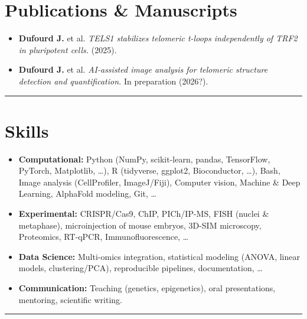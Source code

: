 \documentclass[11pt,a4paper]{article}
\let\oldlabelitemi\labelitemi
\begin{document}
\section*{Publications \& Manuscripts}
\renewcommand{\labelitemi}{\faBook}
\begin{itemize}
  \item \textbf{Dufourd J.} et al. \textit{TELS1 stabilizes telomeric \textit{t}-loops independently of TRF2 in pluripotent cells.} (2025).
  \item \textbf{Dufourd J.} et al. \textit{AI-assisted image analysis for telomeric structure detection and quantification.} In preparation (2026?).
\end{itemize}
\renewcommand{\labelitemi}{\oldlabelitemi}
\vspace{2pt}
\noindent\textcolor{sapin}{\rule{\textwidth}{0.6pt}}
\section*{Skills} %
\begin{itemize}
    \renewcommand{\labelitemi}{\raisebox{0.2ex}{\scalebox{0.7}{\faTerminal}}}
    \item \textbf{Computational:} Python (NumPy, scikit-learn, pandas, TensorFlow, PyTorch, Matplotlib, \ldots), R (tidyverse, ggplot2, Bioconductor, \ldots), Bash, Image analysis (CellProfiler, ImageJ/Fiji), Computer vision, Machine \& Deep Learning, AlphaFold modeling, Git, \ldots
    \renewcommand{\labelitemi}{\raisebox{0.2ex}{\scalebox{1}{\faFlask}}}
    \item \textbf{Experimental:} CRISPR/Cas9, ChIP, PICh/IP-MS, FISH (nuclei \& metaphase), microinjection of mouse embryos, 3D-SIM microscopy, Proteomics, RT-qPCR, Immunofluorescence, \ldots
    \renewcommand{\labelitemi}{\raisebox{0.2ex}{\scalebox{1}{\faChartLine}}}
    \item \textbf{Data Science:} Multi-omics integration, statistical modeling (ANOVA, linear models, clustering/PCA), reproducible pipelines, documentation, \ldots
    \renewcommand{\labelitemi}{\raisebox{0.2ex}{\scalebox{1}{\faCommentDots}}}
    \item \textbf{Communication:} Teaching (genetics, epigenetics), oral presentations, mentoring, scientific writing.
\end{itemize} \renewcommand{\labelitemi}{\oldlabelitemi}
\vspace{2pt}
\noindent\textcolor{sapin}{\rule{\textwidth}{0.6pt}}
\end{document}
